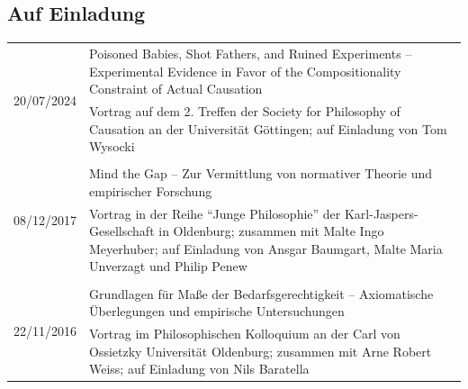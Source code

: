 \documentclass[a4paper,10pt]{article}
\begin{document}
\subsection*{Auf Einladung}
\begin{longtable}{p{2.5cm}p{11cm}}
\multirow{2}{2.5cm}{\footnotesize{20/07/2024}} & Poisoned Babies, Shot Fathers, and Ruined Experiments -- Experimental Evidence in Favor of the Compositionality Constraint of Actual Causation\\
& \footnotesize{Vortrag auf dem 2. Treffen der Society for Philosophy of Causation an der Universität Göttingen; auf Einladung von Tom Wysocki}\\
\\
\multirow{2}{2.5cm}{\footnotesize{08/12/2017}} & Mind the Gap -- Zur Vermittlung von normativer Theorie und empirischer Forschung\\
& \footnotesize{Vortrag in der Reihe \enquote{Junge Philosophie} der Karl-Jaspers-Gesellschaft in Oldenburg; zusammen mit Malte Ingo Meyerhuber; auf Einladung von Ansgar Baumgart, Malte Maria Unverzagt und Philip Penew}\\
\\
\multirow{2}{2.5cm}{\footnotesize{22/11/2016}} & Grundlagen für Maße der Bedarfsgerechtigkeit -- Axiomatische Überlegungen und empirische Untersuchungen\\
& \footnotesize{Vortrag im Philosophischen Kolloquium an der Carl von Ossietzky Universität Oldenburg; zusammen mit Arne Robert Weiss; auf Einladung von Nils Baratella}\\
\end{longtable}


\end{document}
